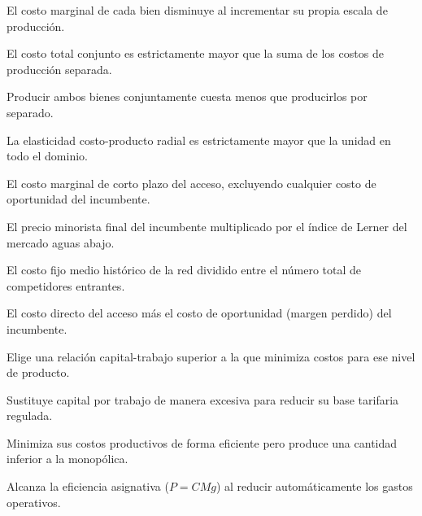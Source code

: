 \begin{opts}
    \item El costo marginal de cada bien disminuye al incrementar su propia escala de producción.
    \item El costo total conjunto es estrictamente mayor que la suma de los costos de producción separada.
    \item Producir ambos bienes conjuntamente cuesta menos que producirlos por separado.
    \item La elasticidad costo-producto radial es estrictamente mayor que la unidad en todo el dominio.
\end{opts}

\begin{opts}
    \item El costo marginal de corto plazo del acceso, excluyendo cualquier costo de oportunidad del incumbente.
    \item El precio minorista final del incumbente multiplicado por el índice de Lerner del mercado aguas abajo.
    \item El costo fijo medio histórico de la red dividido entre el número total de competidores entrantes.
    \item El costo directo del acceso más el costo de oportunidad (margen perdido) del incumbente.
\end{opts}

\begin{opts}
    \item Elige una relación capital-trabajo superior a la que minimiza costos para ese nivel de producto.
    \item Sustituye capital por trabajo de manera excesiva para reducir su base tarifaria regulada.
    \item Minimiza sus costos productivos de forma eficiente pero produce una cantidad inferior a la monopólica.
    \item Alcanza la eficiencia asignativa ($P = CMg$) al reducir automáticamente los gastos operativos.
\end{opts}

